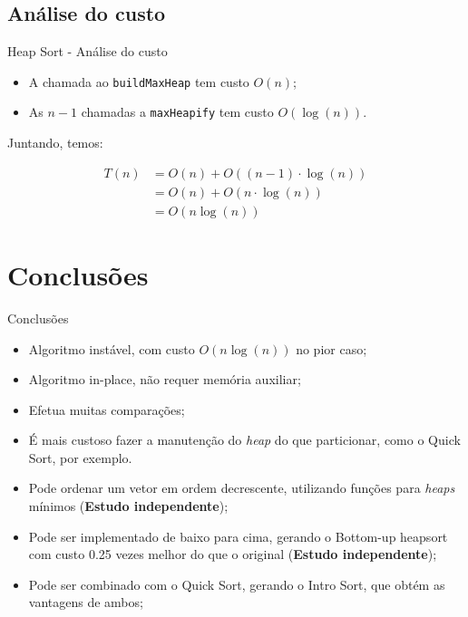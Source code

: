 \documentclass[t, 10pt]{beamer}
\begin{document}
  \subsection{Análise do custo}
  \begin{frame}{Heap Sort - Análise do custo}
    \begin{itemize}
      \item A chamada ao \texttt{buildMaxHeap} tem custo $O(n)$;
      \item As $n - 1$ chamadas a \texttt{maxHeapify} tem custo $O(\log(n))$.
    \end{itemize}
    Juntando, temos:
    
    \begin{align*}
      T(n)
      &= O(n) + O((n - 1) \cdot \log(n)) \\
      &= O(n) + O(n \cdot \log(n)) \\
      &= O(n \log(n))
    \end{align*}
  \end{frame}

  \section{Conclusões}
  \begin{frame}{Conclusões}
    \begin{itemize}
      \item Algoritmo instável, com custo $O(n\log(n))$ no pior caso;
      \item Algoritmo in-place, não requer memória auxiliar;
      \item Efetua muitas comparações;
      \item É mais custoso fazer a manutenção do \emph{heap} do que particionar, como
      o Quick Sort, por exemplo.
      \item Pode ordenar um vetor em ordem decrescente, utilizando funções
      para \emph{heaps} mínimos (\textbf{Estudo independente});
      \item Pode ser implementado de baixo para cima, gerando o Bottom-up heapsort com
      custo 0.25 vezes melhor do que o original (\textbf{Estudo independente});
      \item Pode ser combinado com o Quick Sort, gerando o Intro Sort, que obtém as vantagens
      de ambos;
    \end{itemize}
  \end{frame}
\end{document}
